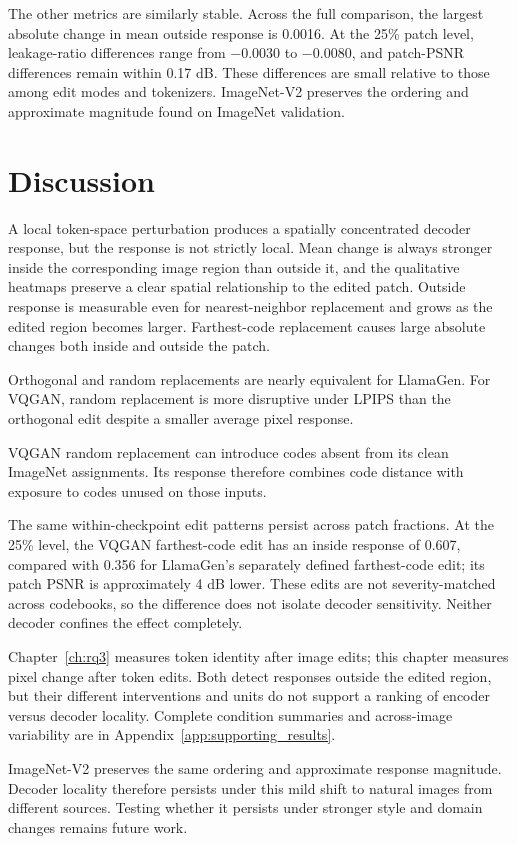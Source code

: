 The other metrics are similarly stable. Across the full comparison, the
largest absolute change in mean outside response is 0.0016. At the 25\% patch
level, leakage-ratio differences range from $-0.0030$ to $-0.0080$, and
patch-PSNR differences remain within 0.17 dB. These differences are small
relative to those among edit modes and tokenizers. ImageNet-V2 preserves the
ordering and approximate magnitude found on ImageNet validation.
\section{Discussion}
\label{sec:rq4_discussion}

A local token-space perturbation produces a spatially concentrated decoder
response, but the response is not strictly local. Mean change is always stronger
inside the corresponding image region than outside it, and the qualitative
heatmaps preserve a clear spatial relationship to the edited patch.
Outside response is measurable even for nearest-neighbor replacement and grows as
the edited region becomes larger. Farthest-code replacement causes large
absolute changes both inside and outside the patch.

Orthogonal and random replacements are nearly equivalent for LlamaGen.
For VQGAN, random replacement is more disruptive under LPIPS than the
orthogonal edit despite a smaller average pixel response.

VQGAN random replacement can introduce codes absent from its clean ImageNet
assignments. Its response therefore combines code distance with exposure to
codes unused on those inputs.

The same within-checkpoint edit patterns persist across patch fractions.
At the 25\% level, the VQGAN farthest-code edit has an inside response of
0.607, compared with 0.356 for LlamaGen's separately defined farthest-code
edit; its patch PSNR is approximately 4 dB lower. These edits are not
severity-matched across codebooks, so the difference does not isolate decoder
sensitivity. Neither decoder confines the effect completely.

Chapter~\ref{ch:rq3} measures token identity after image edits; this chapter
measures pixel change after token edits. Both detect responses outside the
edited region, but their different interventions and units do not support a
ranking of encoder versus decoder locality. Complete condition summaries and
across-image variability are in Appendix~\ref{app:supporting_results}.

ImageNet-V2 preserves the same ordering and approximate response magnitude.
Decoder locality therefore persists under this mild shift to natural images
from different sources. Testing whether it persists under stronger style and
domain changes remains future work.
